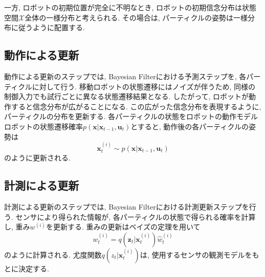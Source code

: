 一方, ロボットの初期位置が完全に不明なとき, ロボットの初期信念分布は状態空間$\mathcal{X}$全体の一様分布と考えられる. 
その場合は, パーティクルの姿勢は一様分布に従うように配置する. 



\subsection{動作による更新}

動作による更新のステップでは, Bayesian Filterにおける予測ステップを, 各パーティクルに対して行う. 
移動ロボットの状態遷移にはノイズが伴うため, 同様の制御入力でも試行ごとに異なる状態遷移結果となる. 
したがって, ロボットが動作すると信念分布が広がることになる. 
この広がった信念分布を表現するように, パーティクルの分布を更新する. 
各パーティクルの状態をロボットの動作モデル
ロボットの状態遷移確率$p(\bm{x} | \bm{x}_{t-1}, \bm{u}_{t})$とすると, 
動作後の各パーティクルの姿勢は
\begin{equation}
\label{particle trans prob}
  \bm{x}^{(i)}_{t} \sim p(\bm{x} | \bm{x}_{t-1}, \bm{u}_{t})
\end{equation}
のように更新される. 


\subsection{計測による更新}

計測による更新のステップでは, Bayesian Filterにおける計測更新ステップを行う. 
センサにより得られた情報が, 各パーティクルの状態で得られる確率を計算し, 重み$w^{(i)}$を更新する. 
重みの更新はベイズの定理を用いて
\begin{equation}
\label{weight}
  w^{(i)}_{t} = q(\bm{z}_{t} | \bm{x}^{(i)}_{t}) \hat{w}^{(i)}_{t}
\end{equation}
のように計算される. 
尤度関数$q(z_{t} | \bm{x}^{(i)}_{t})$は, 使用するセンサの観測モデルをもとに決定する. 

